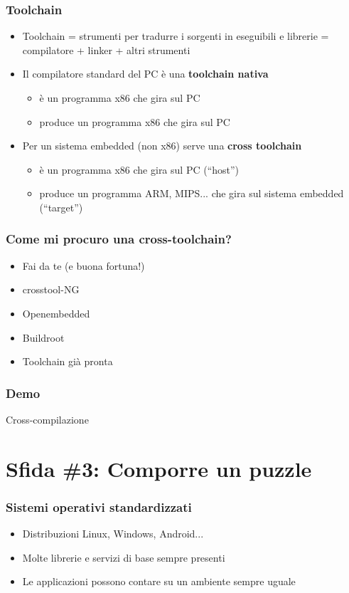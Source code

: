 \documentclass[xetex,table]{beamer}
\begin{document}
\begin{frame}
\frametitle{Toolchain}
  \begin{itemize}
  \item Toolchain = strumenti per tradurre i sorgenti in eseguibili e
    librerie = compilatore + linker + altri strumenti
  \item Il compilatore standard del PC è una {\bf toolchain nativa}
    \begin{itemize}
    \item è un programma x86 che gira sul PC
    \item produce un programma x86 che gira sul PC
    \end{itemize}
  \item Per un sistema embedded (non x86) serve una {\bf cross
    toolchain}
    \begin{itemize}
    \item è un programma x86 che gira sul PC (``host'')
    \item produce un programma ARM, MIPS... che gira sul sistema
      embedded (``target'')
    \end{itemize}
  \end{itemize}
\end{frame}

\begin{frame}
\frametitle{Come mi procuro una cross-toolchain?}
  \begin{itemize}
  \item Fai da te (e buona fortuna!)
  \item crosstool-NG
  \item Openembedded
  \item Buildroot
  \item Toolchain già pronta
  \end{itemize}
\end{frame}

\begin{frame}
\frametitle[Demo! Cross-compilazione]{Demo}
  \begin{center}
    \LARGE
    Cross-compilazione
  \end{center}
\end{frame}

\section{Sfida \#3: Comporre un puzzle}

\begin{frame}
\frametitle{Sistemi operativi standardizzati}
  \begin{itemize}
  \item Distribuzioni Linux, Windows, Android...
  \item Molte librerie e servizi di base sempre presenti
  \item Le applicazioni possono contare su un ambiente sempre uguale
  \end{itemize}
\end{frame}
\end{document}
